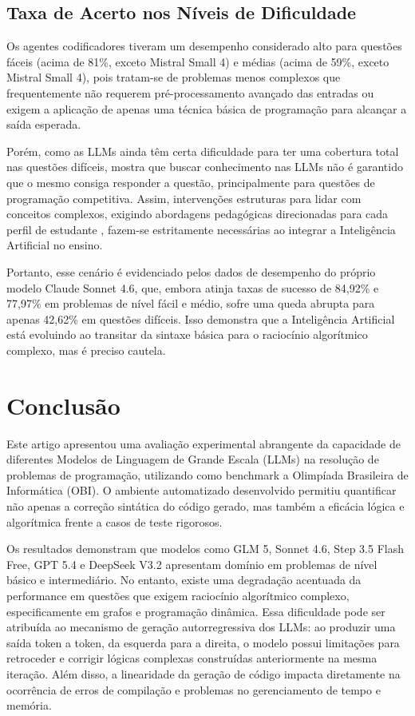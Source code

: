 \documentclass[12pt]{article}
\begin{document}
\subsection{Taxa de Acerto nos Níveis de Dificuldade}

Os agentes codificadores tiveram um desempenho considerado alto para questões fáceis (acima de 81\%, exceto Mistral Small 4) e médias (acima de 59\%, exceto Mistral Small 4), pois tratam-se de problemas menos complexos que frequentemente não requerem pré-processamento avançado das entradas ou exigem a aplicação de apenas uma técnica básica de programação para alcançar a saída esperada.

Porém, como as LLMs ainda têm certa dificuldade para ter uma cobertura total nas questões difíceis, mostra que buscar conhecimento nas LLMs não é garantido que o mesmo consiga responder a questão, principalmente para questões de programação competitiva. Assim, intervenções estruturas para lidar com conceitos complexos, exigindo abordagens pedagógicas direcionadas para cada perfil de estudante \cite{baist2017analysis}, fazem-se estritamente necessárias ao integrar a Inteligência Artificial no ensino.

Portanto, esse cenário é evidenciado pelos dados de desempenho do próprio modelo Claude Sonnet 4.6, que, embora atinja taxas de sucesso de 84,92\% e 77,97\% em problemas de nível fácil e médio, sofre uma queda abrupta para apenas 42,62\% em questões difíceis. Isso demonstra que a Inteligência Artificial está evoluindo ao transitar da sintaxe básica para o raciocínio algorítmico complexo, mas é preciso cautela.

\section{Conclusão}

Este artigo apresentou uma avaliação experimental abrangente da capacidade de diferentes Modelos de Linguagem de Grande Escala (LLMs) na resolução de problemas de programação, utilizando como benchmark a Olimpíada Brasileira de Informática (OBI). O ambiente automatizado desenvolvido permitiu quantificar não apenas a correção sintática do código gerado, mas também a eficácia lógica e algorítmica frente a casos de teste rigorosos.

Os resultados demonstram que modelos como GLM 5, Sonnet 4.6, Step 3.5 Flash Free, GPT 5.4 e DeepSeek V3.2 apresentam domínio em problemas de nível básico e intermediário. No entanto, existe uma degradação acentuada da performance em questões que exigem raciocínio algorítmico complexo, especificamente em grafos e programação dinâmica. Essa dificuldade pode ser atribuída ao mecanismo de geração autorregressiva dos LLMs: ao produzir uma saída token a token, da esquerda para a direita, o modelo possui limitações para retroceder e corrigir lógicas complexas construídas anteriormente na mesma iteração. Além disso, a linearidade da geração de código impacta diretamente na ocorrência de erros de compilação e problemas no gerenciamento de tempo e memória.
\end{document}
